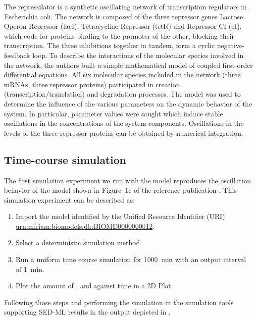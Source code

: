 The repressilator is a synthetic oscillating network of transcription regulators in Escherichia coli. The network is composed of the three repressor genes Lactose Operon Repressor (lacI), Tetracycline Repressor (tetR) and Repressor CI (cI), which code for proteins binding to the promoter of the other, blocking their transcription. The three inhibitions together in tandem, form a cyclic negative-feedback loop. To describe the interactions of the molecular species involved in the network, the authors built a simple mathematical model of coupled first-order differential equations. All six molecular species included in the network (three mRNAs, three repressor proteins) participated in creation (transcription/translation) and degradation processes. The model was used to determine the influence of the various parameters on the dynamic behavior of the system. In particular, parameter values were sought which induce stable oscillations in the concentrations of the system components. Oscillations in the levels of the three repressor proteins can be obtained by numerical integration. 

\subsection{Time-course simulation}
\label{sec:timecourse}
The first simulation experiment we run with the model reproduces the oscillation behavior of the model shown in Figure~1c of the reference publication \citep{Elowitz:2000}. This simulation experiment can be described as:

\begin{enumerate}
 	\item{Import the model identified by the Unified Resource Identifier (URI) \citep{Berners-Lee:2005}\\ 	\url{urn:miriam:biomodels.db:BIOMD0000000012}.}
 	\item {Select a deterministic simulation method.}
 	\item{Run a uniform time course simulation for 1000~min with an output interval of 1~min.}
 	\item{Plot the amount of ,  and  against time in a 2D Plot.}
 \end{enumerate}

Following those steps and performing the simulation in the simulation tools supporting SED-ML results in the output depicted in .


